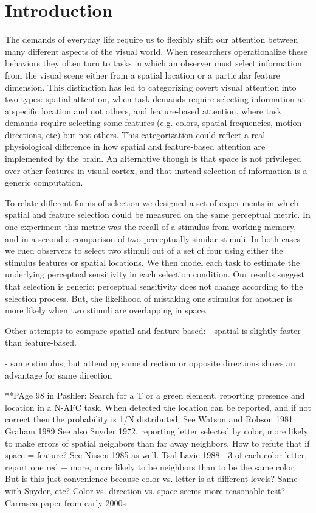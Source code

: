 
\section{Introduction}

The demands of everyday life require us to flexibly shift our attention between many different aspects of the visual world. When researchers operationalize these behaviors they often turn to tasks in which an observer must select information from the visual scene either from a spatial location or a particular feature dimension. This distinction has led to categorizing covert visual attention into two types: spatial attention, when task demands require selecting information at a specific location and not others, and feature-based attention, where task demands require selecting some features (e.g. colors, spatial frequencies, motion directions, etc) but not others. This categorization could reflect a real physiological difference in how spatial and feature-based attention are implemented by the brain. An alternative though is that space is not privileged over other features in visual cortex, and that instead selection of information is a generic computation.

To relate different forms of selection we designed a set of experiments in which spatial and feature selection could be measured on the same perceptual metric. In one experiment this metric was the recall of a stimulus from working memory, and in a second a comparison of two perceptually similar stimuli. In both cases we cued observers to select two stimuli out of a set of four using either the stimulus features or spatial locations. We then model each task to estimate the underlying perceptual sensitivity in each selection condition. Our results suggest that selection is generic: perceptual sensitivity does not change according to the selection process. But, the likelihood of mistaking one stimulus for another is more likely when two stimuli are overlapping in space.

Other attempts to compare spatial and feature-based:
\citep{Liu2007-ed} - spatial is slightly faster than feature-based. 

\citep{Saenz2003-qz} - same stimulus, but attending same direction or opposite directions shows an advantage for same direction 


**PAge 98 in Pashler:
Search for a T or a green element, reporting presence and location in a N-AFC task. When detected the location can be reported, and if not correct then the probability is 1/N distributed. 
See Watson and Robson 1981
Graham 1989
See also Snyder 1972, reporting letter selected by color, more likely to make errors of spatial neighbors than far away neighbors. How to refute that if space = feature? See Nissen 1985 as well.
Tsal Lavie 1988 - 3 of each color letter, report one red + more, more likely to be neighbors than to be the same color. But is this just convenience because color vs. letter is at different levels? Same with Snyder, etc? Color vs. direction vs. space seems more reasonable test?
Carrasco paper from early 2000s


